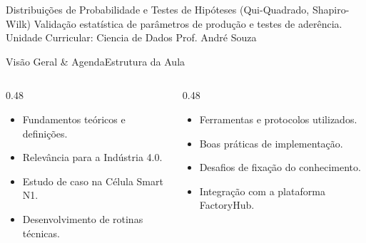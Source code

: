 
\senaicover
  {Distribuições de Probabilidade e Testes de Hipóteses (Qui-Quadrado, Shapiro-Wilk)}
  {Validação estatística de parâmetros de produção e testes de aderência.}
  {Unidade Curricular: Ciencia de Dados}
  {Prof. André Souza}

\begin{senaiframe}{Visão Geral \& Agenda}{Estrutura da Aula}
  \begin{columns}[t]
    \begin{column}{0.48\textwidth}
      \begin{tcolorbox}[senaibluecard, title={1. Conceitos Chave}]
        \begin{itemize}
          \item Fundamentos teóricos e definições.
          \item Relevância para a Indústria 4.0.
        \end{itemize}
      \end{tcolorbox}
      \vspace{4pt}
      \begin{tcolorbox}[senaiambercard, title={3. Aplicação Prática}]
        \begin{itemize}
          \item Estudo de caso na Célula Smart N1.
          \item Desenvolvimento de rotinas técnicas.
        \end{itemize}
      \end{tcolorbox}
    \end{column}
    \begin{column}{0.48\textwidth}
      \begin{tcolorbox}[senairedcard, title={2. Detalhamento Técnico}]
        \begin{itemize}
          \item Ferramentas e protocolos utilizados.
          \item Boas práticas de implementação.
        \end{itemize}
      \end{tcolorbox}
      \vspace{4pt}
      \begin{tcolorbox}[senaigreencard, title={4. Exercícios \& Avaliação}]
        \begin{itemize}
          \item Desafios de fixação do conhecimento.
          \item Integração com a plataforma FactoryHub.
        \end{itemize}
      \end{tcolorbox}
    \end{column}
  \end{columns}
\end{senaiframe}

